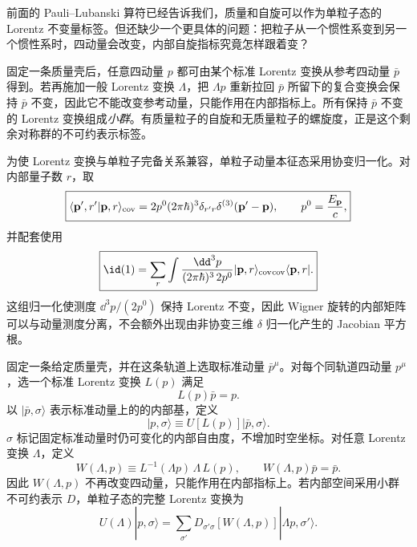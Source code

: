 前面的 Pauli--Lubanski 算符已经告诉我们，质量和自旋可以作为单粒子态的 Lorentz 不变量标签。但还缺少一个更具体的问题：把粒子从一个惯性系变到另一个惯性系时，四动量会改变，内部自旋指标究竟怎样跟着变？

固定一条质量壳后，任意四动量 $p$ 都可由某个标准 Lorentz 变换从参考四动量 $\bar p$ 得到。若再施加一般 Lorentz 变换 $\Lambda$，把 $\Lambda p$ 重新拉回 $\bar p$ 所留下的复合变换会保持 $\bar p$ 不变，因此它不能改变参考动量，只能作用在内部指标上。所有保持 $\bar p$ 不变的 Lorentz 变换组成\emph{小群}。有质量粒子的自旋和无质量粒子的螺旋度，正是这个剩余对称群的不可约表示标签。

为使 Lorentz 变换与单粒子完备关系兼容，单粒子动量本征态采用协变归一化。对内部量子数 $r$，取
\begin{equation}
 \boxed{
 \langle \mathbf p',r'|\mathbf p,r\rangle_{\rm cov}
 =2p^0(2\pi\hbar)^3\delta_{r'r}
 \delta^{(3)}(\mathbf p'-\mathbf p),
 \qquad p^0=\frac{E_{\mathbf p}}{c},}
 \label{eq:rel-state-normalization-si-r9}
\end{equation}
并配套使用
\begin{equation}
 \boxed{
 \id(1)=\sum_r\int
 \frac{\dd^3 p}{(2\pi\hbar)^3\,2p^0}
 |\mathbf p,r\rangle_{\rm cov}
 {}_{\rm cov}\langle\mathbf p,r|.}
 \label{eq:rel-completeness-si-r9}
\end{equation}
这组归一化使测度 $\dd^3 p/(2p^0)$ 保持 Lorentz 不变，因此 Wigner 旋转的内部矩阵可以与动量测度分离，不会额外出现由非协变三维 $\delta$ 归一化产生的 Jacobian 平方根。

固定一条给定质量壳，并在这条轨道上选取标准动量 $\bar p^\mu$。对每个同轨道四动量 $p^\mu$，选一个标准 Lorentz 变换 $L(p)$ 满足
\begin{equation}
 L(p)\bar p=p.
 \label{eq:wigner-standard-boost-dp9}
\end{equation}
以 $|\bar p,\sigma\rangle$ 表示标准动量上的的内部基，定义
\begin{equation}
 |p,\sigma\rangle
 \equiv U[L(p)]|\bar p,\sigma\rangle.
 \label{eq:wigner-state-definition-dp9}
\end{equation}
$\sigma$ 标记固定标准动量时仍可变化的内部自由度，不增加时空坐标。对任意 Lorentz 变换 $\Lambda$，定义
\begin{equation}
 \boxed{
 W(\Lambda,p)
 \equiv L^{-1}(\Lambda p)\,\Lambda\,L(p),
 \qquad
 W(\Lambda,p)\bar p=\bar p.}
 \label{eq:wigner-little-group-element-dp68}
\end{equation}
因此 $W(\Lambda,p)$ 不再改变四动量，只能作用在内部指标上。若内部空间采用小群不可约表示 $D$，单粒子态的完整 Lorentz 变换为
\begin{equation}
 \boxed{
 U(\Lambda)|p,\sigma\rangle
 =\sum_{\sigma'}
 D_{\sigma'\sigma}[W(\Lambda,p)]
 |\Lambda p,\sigma'\rangle.}
 \label{eq:wigner-state-transform-dp68}
\end{equation}

